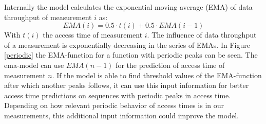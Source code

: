 \documentclass{superfri}
\begin{document}
	Internally the model calculates the exponential moving average (EMA) of data throughput of measurement $i$ as:
	\begin{equation}
	EMA(i) = 0.5 \cdot t(i)+ 0.5 \cdot EMA(i-1)
	\end{equation}
	With $t(i)$ the access time of measurement $i$.
	The influence of data throughput of a measurement is exponentially decreasing in the series of EMAs.
	In Figure \ref{periodic} the EMA-function for a function with periodic peaks can be seen.
	The ema-model can use $EMA(n-1)$ for the prediction of access time of measurement $n$.
	If the model is able to find threshold values of the EMA-function after which another peaks follows, it can use this input information for better access time predictions on sequences with periodic peaks in access time. Depending on how relevant periodic behavior of access times is in our measurements, this additional input information could improve the model.
	\medskip
	
\end{document}
